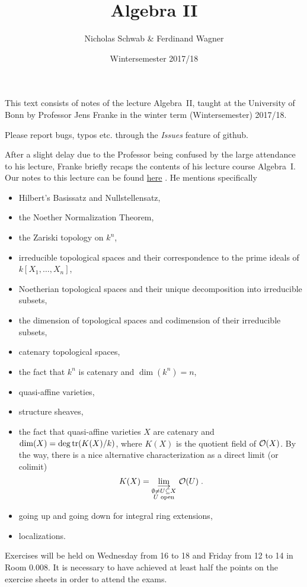 \documentclass[a4paper,parskip=half,numbers=enddot, DIV=12]{scrreprt}
\title{Algebra II}
\author{Nicholas Schwab \& Ferdinand Wagner}
\date{Wintersemester 2017/18}
\begin{document}
\maketitle
{}
 \thispagestyle{plain}
This text consists of notes of the lecture Algebra~II, taught at the University of Bonn by Professor Jens Franke in the winter term (Wintersemester) 2017/18. 

Please report bugs, typos etc. through the \emph{Issues} feature of github.

\tableofcontents

After a slight delay due to the Professor being confused by the large attendance to his lecture, Franke briefly recaps the contents of his lecture course Algebra~I. Our notes to this lecture can be found \href{https://github.com/Nicholas42/AlgebraFranke/tree/master/AlgebraI}{here} \cite{alg1}. He mentions specifically
\begin{itemize}
 \item Hilbert's Basissatz and Nullstellensatz,
 \item the Noether Normalization Theorem,
 \item the Zariski topology on $k^n$,
 \item irreducible topological spaces and their correspondence to the prime ideals of $k[X_1, \ldots, X_n]$,
 \item Noetherian topological spaces and their unique decomposition into irreducible subsets,
 \item the dimension of topological spaces and codimension of their irreducible subsets,
 \item catenary topological spaces,
 \item the fact that $k^n$ is catenary and $\dim(k^n) = n$,
 \item quasi-affine varieties,
 \item structure sheaves,
 \item the fact that quasi-affine varieties $X$ are catenary and $\dim (X) = \deg\operatorname{tr}(K(X)/k)$, where $K(X)$ is the quotient field of $\mathcal{O}(X)$. By the way, there is a nice alternative characterization as a direct limit (or colimit)
 \begin{align*}
 	K(X)=\colimit[\substack{\emptyset\not=U\subseteq X\\U\text{ open}}]\Oo(U)\;.
 \end{align*}
 \item going up and going down for integral ring extensions,
 \item localizations.
\end{itemize}
Exercises will be held on Wednesday from 16 to 18 and Friday from 12 to 14 in Room 0.008. It is necessary to have achieved at least half the points on the exercise sheets in order to attend the exams.
\end{document}
